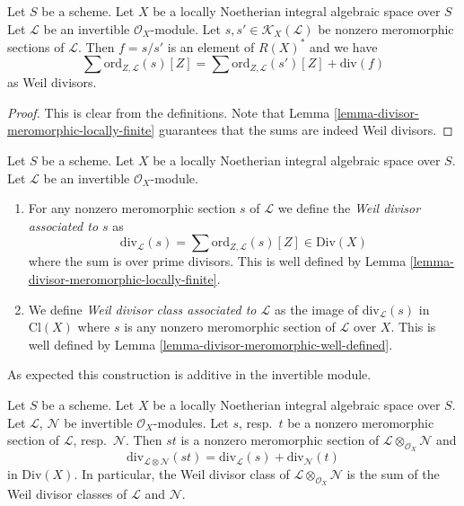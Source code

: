 \begin{lemma}
\label{lemma-divisor-meromorphic-well-defined}
Let $S$ be a scheme. Let $X$ be a locally Noetherian integral algebraic space
over $S$ Let $\mathcal{L}$ be an invertible $\mathcal{O}_X$-module.
Let $s, s' \in \mathcal{K}_X(\mathcal{L})$ be nonzero
meromorphic sections of $\mathcal{L}$. Then $f = s/s'$
is an element of $R(X)^*$ and we have
$$
\sum \text{ord}_{Z, \mathcal{L}}(s)[Z]
=
\sum \text{ord}_{Z, \mathcal{L}}(s')[Z]
+
\text{div}(f)
$$
as Weil divisors.
\end{lemma}

\begin{proof}
This is clear from the definitions.
Note that Lemma \ref{lemma-divisor-meromorphic-locally-finite}
guarantees that the sums are indeed Weil divisors.
\end{proof}

\begin{definition}
\label{definition-divisor-invertible-sheaf}
Let $S$ be a scheme. Let $X$ be a locally Noetherian integral algebraic space
over $S$. Let $\mathcal{L}$ be an invertible $\mathcal{O}_X$-module.
\begin{enumerate}
\item For any nonzero meromorphic section $s$ of $\mathcal{L}$
we define the {\it Weil divisor associated to $s$} as
$$
\text{div}_\mathcal{L}(s) =
\sum \text{ord}_{Z, \mathcal{L}}(s) [Z] \in \text{Div}(X)
$$
where the sum is over prime divisors. This is well defined by
Lemma \ref{lemma-divisor-meromorphic-locally-finite}.
\item We define {\it Weil divisor class associated to $\mathcal{L}$}
as the image of $\text{div}_\mathcal{L}(s)$ in $\text{Cl}(X)$
where $s$ is any nonzero meromorphic section of $\mathcal{L}$ over $X$.
This is well defined by
Lemma \ref{lemma-divisor-meromorphic-well-defined}.
\end{enumerate}
\end{definition}

\noindent
As expected this construction is additive in the invertible module.

\begin{lemma}
\label{lemma-c1-additive}
Let $S$ be a scheme. Let $X$ be a locally Noetherian integral algebraic space
over $S$. Let $\mathcal{L}$, $\mathcal{N}$ be invertible
$\mathcal{O}_X$-modules. Let $s$, resp.\ $t$ be a nonzero meromorphic section
of $\mathcal{L}$, resp.\ $\mathcal{N}$. Then $st$ is a nonzero
meromorphic section of $\mathcal{L} \otimes_{\mathcal{O}_X} \mathcal{N}$ and
$$
\text{div}_{\mathcal{L} \otimes \mathcal{N}}(st)
=
\text{div}_\mathcal{L}(s) + \text{div}_\mathcal{N}(t)
$$
in $\text{Div}(X)$. In particular, the Weil divisor class of
$\mathcal{L} \otimes_{\mathcal{O}_X} \mathcal{N}$ is the sum
of the Weil divisor classes of $\mathcal{L}$ and $\mathcal{N}$.
\end{lemma}

